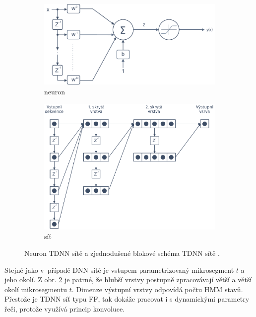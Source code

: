 \begin{figure}[htpb]
  \centering
  \begin{subfigure}[b]{0.45\textwidth}
    \includegraphics[width=\textwidth]{./ch4-asr/img/neuron-tdnn.pdf}
    \caption{neuron}
    \label{fig:asr:acoustic:dnn:tdnn:neuron}
  \end{subfigure}
  \begin{subfigure}[b]{0.35\textwidth}
    \includegraphics[width=\textwidth]{./ch4-asr/img/tdnn.pdf}
    \caption{síť}
    \label{fig:asr:acoustic:dnn:tdnn:net}
  \end{subfigure}
  \caption[Neuron TDNN sitě a její zjednodušené blokové schéma.]{Neuron TDNN sítě a zjednodušené blokové schéma TDNN sítě \cite{Craig2000}.}
  \label{fig:asr:acoustic:dnn:tdnn}
\end{figure}

Stejně jako v~případě DNN sítě je vstupem parametrizovaný mikrosegment $t$ a jeho okolí. Z obr. \ref{fig:asr:acoustic:dnn:tdnn:net} je patrné, že hlubší vrstvy postupně zpracovávají větší a větší okolí mikrosegmentu $t$. Dimenze výstupní vrstvy odpovídá počtu HMM stavů. Přestože je TDNN síť typu FF, tak dokáže pracovat i s dynamickými parametry řeči, protože využívá princip konvoluce.
